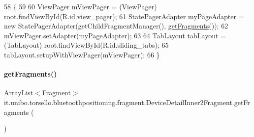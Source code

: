 \begin{DoxyCode}
58                                              \{
59 
60         ViewPager mViewPager = (ViewPager) root.findViewById(R.id.view\_pager);
61         StatePagerAdapter myPageAdapter = \textcolor{keyword}{new} StatePagerAdapter(getChildFragmentManager(), 
      \hyperlink{classit_1_1unibo_1_1torsello_1_1bluetoothpositioning_1_1fragment_1_1DeviceDetailInner2Fragment_a74ebcb936381919cfe4f3542585203c4_a74ebcb936381919cfe4f3542585203c4}{getFragments}());
62         mViewPager.setAdapter(myPageAdapter);
63 
64         TabLayout tabLayout = (TabLayout) root.findViewById(R.id.sliding\_tabs);
65         tabLayout.setupWithViewPager(mViewPager);
66     \}
\end{DoxyCode}
\hypertarget{classit_1_1unibo_1_1torsello_1_1bluetoothpositioning_1_1fragment_1_1DeviceDetailInner2Fragment_a74ebcb936381919cfe4f3542585203c4_a74ebcb936381919cfe4f3542585203c4}{}\label{classit_1_1unibo_1_1torsello_1_1bluetoothpositioning_1_1fragment_1_1DeviceDetailInner2Fragment_a74ebcb936381919cfe4f3542585203c4_a74ebcb936381919cfe4f3542585203c4} 
\paragraph{\texorpdfstring{get\+Fragments()}{getFragments()}}
{\footnotesize\ttfamily Array\+List$<$Fragment$>$ it.\+unibo.\+torsello.\+bluetoothpositioning.\+fragment.\+Device\+Detail\+Inner2\+Fragment.\+get\+Fragments (\begin{DoxyParamCaption}{ }\end{DoxyParamCaption})\hspace{0.3cm}{\ttfamily [private]}}


